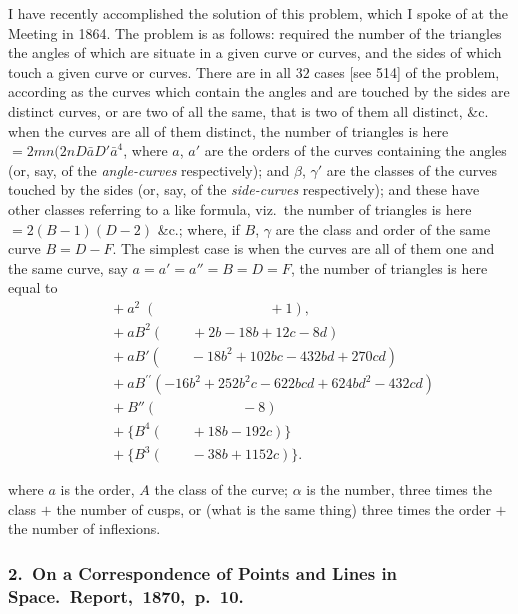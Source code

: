 \documentclass[11pt,a4paper]{article}
\theoremstyle{plain}
\theoremstyle{definition}
\begin{document}
I have recently accomplished the solution of this problem, which I spoke of at
the Meeting in 1864.  The problem is as follows: required the number of the triangles
the angles of which are situate in a given curve or curves, and the sides of which
touch a given curve or curves.  There are in all $32$ cases [see 514] of the problem,
according as the curves which contain the angles and are touched by the sides are
distinct curves, or are two of all the same, that is two of them all distinct, \&c.
when the curves are all of them distinct, the number of triangles is here $= 2mn(2nD\bar{a}D'\bar{a}^4$,
where $a$, $a'$ are the orders of the curves containing the angles (or, say, of the
\textit{angle-curves} respectively); and $\beta$, $\gamma'$ are the classes of the curves touched by the
sides (or, say, of the \textit{side-curves} respectively); and these have other classes referring to
a like formula, viz.\ the number of triangles is here $= 2(B - 1)(D - 2)$ \&c.; where,
if $B$, $\gamma$ are the class and order of the same curve $B = D - F$.  The simplest case is when the curves are all of them one and the same curve, say $a = a' = a'' = B = D = F$,
the number of triangles is here equal to
\begin{align*}
&\quad +a^2\;( \qquad\qquad\qquad\qquad +1), \\
&\quad +a B^2( \qquad +2b - 18b + 12c - 8d ) \\
&\quad +a B'( \qquad -18b^2 + 102bc - 432bd + 270cd ) \\
&\quad +a B^{\prime\prime}( -16b^2 + 252b^2 c - 622bcd + 624bd^2 - 432cd ) \\
&\quad +B''( \qquad \qquad\qquad -8 ) \\
&\quad +\{B^4( \qquad +18b - 192c )\} \\
&\quad +\{B^3( \qquad -38b + 1152c )\}.
\end{align*}

\clearpage

\noindent
where $a$ is the order, $A$ the class of the curve; $\alpha$ is the number, three times the
class $+$ the number of cusps, or (what is the same thing) three times the order $+$ the
number of inflexions.

\subsubsection*{2.\ On a Correspondence of Points and Lines in Space.\ Report,\ 1870,\ p.\ 10.}
\end{document}
